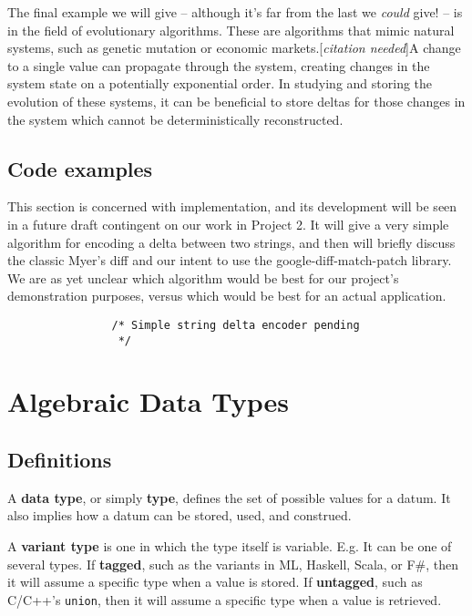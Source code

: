 \documentclass[12pt,a4paper]{article}
\newcommand{\citationNeeded}{[\textit{citation needed}]}
\begin{document}
		The final example we will give -- although it's far from the last we \textit{could} give! -- is in the field of evolutionary algorithms. These are algorithms that mimic natural systems, such as genetic mutation or economic markets.\citationNeeded A change to a single value can propagate through the system, creating changes in the system state on a potentially exponential order. In studying and storing the evolution of these systems, it can be beneficial to store deltas for those changes in the system which cannot be deterministically reconstructed.
		
		\subsection{Code examples}
		
		This section is concerned with implementation, and its development will be seen in a future draft contingent on our work in Project 2. It will give a very simple algorithm for encoding a delta between two strings, and then will briefly discuss the classic Myer's diff\cite{Myers} and our intent to use the google-diff-match-patch library. We are as yet unclear which algorithm would be best for our project's demonstration purposes, versus which would be best for an actual application.
		
			\begin{lstlisting}
				/* Simple string delta encoder pending
				 */
			\end{lstlisting}
	
	\section{Algebraic Data Types}
		
		\subsection{Definitions}
		
		A \textbf{data type}, or simply \textbf{type}, defines the set of possible values for a datum. It also implies how a datum can be stored, used, and construed.
		
		A \textbf{variant type} is one in which the type itself is variable. E.g. It can be one of several types. If \textbf{tagged}, such as the variants in ML, Haskell, Scala, or F\#, then it will assume a specific type when a value is stored. If \textbf{untagged}, such as C/C++'s \texttt{union}, then it will assume a specific type when a value is retrieved.
		
\end{document}
